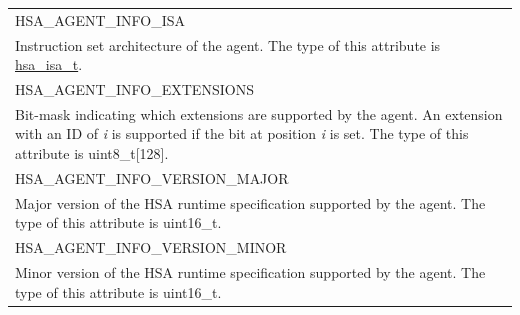 \documentclass[final,oneside]{book}
\newcommand{\reftyp}[1]{#1}
\newcommand{\refenu}[1]{\reftyp{#1}}
\begin{document}
\begin{longtable}{@{\hspace{2em}}p{\linewidth-2em}}
\hspace{-2em}\refenu{HSA_\-AGENT_\-INFO_\-ISA}\\Instruction set architecture of the agent. The type of this attribute is \hyperlink{group__code-object_1ga465ac514a6c8ca972ddbb16b7f0e3e1d}{hsa_\-isa_\-t}.\\[2mm]
\hspace{-2em}\refenu{HSA_\-AGENT_\-INFO_\-EXTENSIONS}\\Bit-mask indicating which extensions are supported by the agent. An extension with an ID of \textit{i} is supported if the bit at position \textit{i} is set. The type of this attribute is uint8_t[128].\\[2mm]
\hspace{-2em}\refenu{HSA_\-AGENT_\-INFO_\-VERSION_\-MAJOR}\\Major version of the HSA runtime specification supported by the agent. The type of this attribute is uint16_\-t.\\[2mm]
\hspace{-2em}\refenu{HSA_\-AGENT_\-INFO_\-VERSION_\-MINOR}\\Minor version of the HSA runtime specification supported by the agent. The type of this attribute is uint16_\-t.
\end{longtable}
\end{document}
